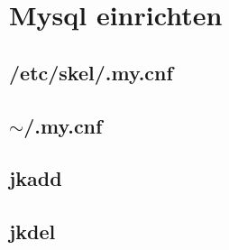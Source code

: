 \section{Mysql einrichten}

\subsection{/etc/skel/.my.cnf}
\begin{tcolorbox}

\end{tcolorbox}


\subsection{$\sim$/.my.cnf}
\begin{tcolorbox}

\end{tcolorbox}

\subsection{jkadd}
\begin{tcolorbox}

\end{tcolorbox}

\subsection{jkdel}
\begin{tcolorbox}

\end{tcolorbox}


